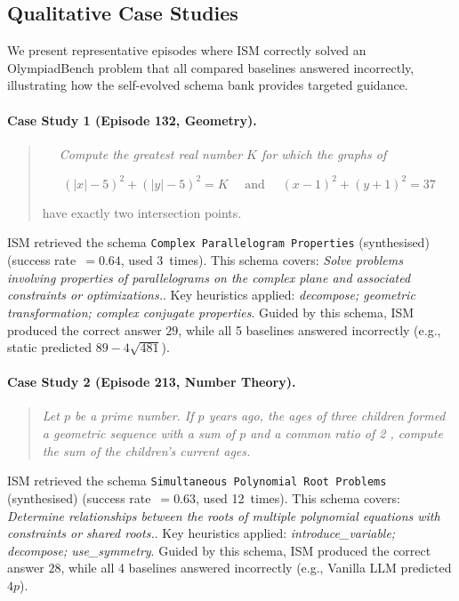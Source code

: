 \subsection*{Qualitative Case Studies}
We present representative episodes where ISM correctly solved an OlympiadBench problem that all compared baselines answered incorrectly, illustrating how the self-evolved schema bank provides targeted guidance.

\paragraph{Case Study 1 (Episode 132, Geometry).}
\begin{quote}\itshape
$\quad$ Compute the greatest real number $K$ for which the graphs of

\[
(|x|-5)^{2}+(|y|-5)^{2}=K \quad \text { and } \quad(x-1)^{2}+(y+1)^{2}=37
\]

have exactly two intersection points.
\end{quote}

ISM retrieved the schema \texttt{Complex Parallelogram Properties} (synthesised) (success rate~$=0.64$, used 3~times). 
This schema covers: \textit{Solve problems involving properties of parallelograms on the complex plane and associated constraints or optimizations.}. 
Key heuristics applied: \textit{decompose; geometric transformation; complex conjugate properties}. 
Guided by this schema, ISM produced the correct answer $\boxed{29}$, while all 5 baselines answered incorrectly (e.g., static predicted $89 - 4 \sqrt{481}$). 

\paragraph{Case Study 2 (Episode 213, Number Theory).}
\begin{quote}\itshape
Let $p$ be a prime number. If $p$ years ago, the ages of three children formed a geometric sequence with a sum of $p$ and a common ratio of 2 , compute the sum of the children's current ages.
\end{quote}

ISM retrieved the schema \texttt{Simultaneous Polynomial Root Problems} (synthesised) (success rate~$=0.63$, used 12~times). 
This schema covers: \textit{Determine relationships between the roots of multiple polynomial equations with constraints or shared roots.}. 
Key heuristics applied: \textit{introduce_variable; decompose; use_symmetry}. 
Guided by this schema, ISM produced the correct answer $\boxed{28}$, while all 4 baselines answered incorrectly (e.g., Vanilla LLM predicted $4p$). 

